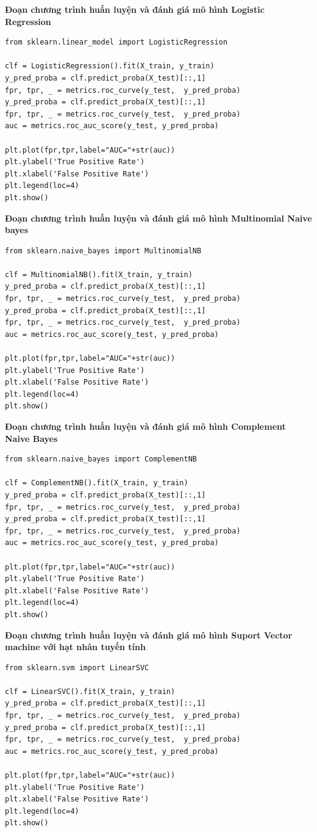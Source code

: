 \documentclass[../DoAn.tex]{subfiles}
\begin{document}
\textbf{Đoạn chương trình huấn luyện và đánh giá mô hình Logistic Regression}
\begin{lstlisting}
from sklearn.linear_model import LogisticRegression

clf = LogisticRegression().fit(X_train, y_train)
y_pred_proba = clf.predict_proba(X_test)[::,1]
fpr, tpr, _ = metrics.roc_curve(y_test,  y_pred_proba)
y_pred_proba = clf.predict_proba(X_test)[::,1]
fpr, tpr, _ = metrics.roc_curve(y_test,  y_pred_proba)
auc = metrics.roc_auc_score(y_test, y_pred_proba)

plt.plot(fpr,tpr,label="AUC="+str(auc))
plt.ylabel('True Positive Rate')
plt.xlabel('False Positive Rate')
plt.legend(loc=4)
plt.show()
\end{lstlisting}
\textbf{Đoạn chương trình huấn luyện và đánh giá mô hình Multinomial Naive bayes}
\begin{lstlisting}
from sklearn.naive_bayes import MultinomialNB

clf = MultinomialNB().fit(X_train, y_train)
y_pred_proba = clf.predict_proba(X_test)[::,1]
fpr, tpr, _ = metrics.roc_curve(y_test,  y_pred_proba)
y_pred_proba = clf.predict_proba(X_test)[::,1]
fpr, tpr, _ = metrics.roc_curve(y_test,  y_pred_proba)
auc = metrics.roc_auc_score(y_test, y_pred_proba)

plt.plot(fpr,tpr,label="AUC="+str(auc))
plt.ylabel('True Positive Rate')
plt.xlabel('False Positive Rate')
plt.legend(loc=4)
plt.show()
\end{lstlisting}

\textbf{Đoạn chương trình huấn luyện và đánh giá mô hình Complement Naive Bayes}
\begin{lstlisting}
from sklearn.naive_bayes import ComplementNB

clf = ComplementNB().fit(X_train, y_train)
y_pred_proba = clf.predict_proba(X_test)[::,1]
fpr, tpr, _ = metrics.roc_curve(y_test,  y_pred_proba)
y_pred_proba = clf.predict_proba(X_test)[::,1]
fpr, tpr, _ = metrics.roc_curve(y_test,  y_pred_proba)
auc = metrics.roc_auc_score(y_test, y_pred_proba)

plt.plot(fpr,tpr,label="AUC="+str(auc))
plt.ylabel('True Positive Rate')
plt.xlabel('False Positive Rate')
plt.legend(loc=4)
plt.show()
\end{lstlisting}
\textbf{Đoạn chương trình huấn luyện và đánh giá mô hình Suport Vector machine với hạt nhân tuyến tính}
\begin{lstlisting}
from sklearn.svm import LinearSVC

clf = LinearSVC().fit(X_train, y_train)
y_pred_proba = clf.predict_proba(X_test)[::,1]
fpr, tpr, _ = metrics.roc_curve(y_test,  y_pred_proba)
y_pred_proba = clf.predict_proba(X_test)[::,1]
fpr, tpr, _ = metrics.roc_curve(y_test,  y_pred_proba)
auc = metrics.roc_auc_score(y_test, y_pred_proba)

plt.plot(fpr,tpr,label="AUC="+str(auc))
plt.ylabel('True Positive Rate')
plt.xlabel('False Positive Rate')
plt.legend(loc=4)
plt.show()
\end{lstlisting}
\end{document}

